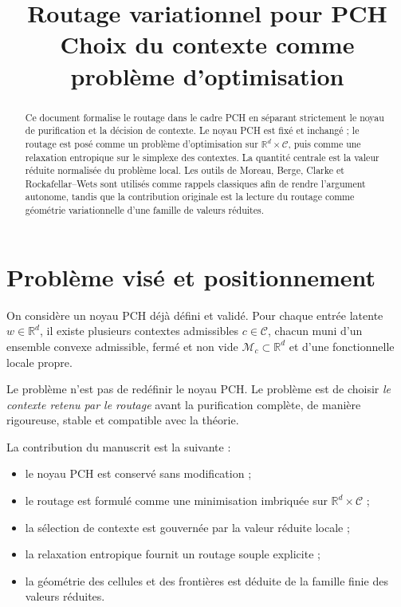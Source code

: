 \documentclass[11pt,a4paper]{article}
\title{Routage variationnel pour PCH\\
\large Choix du contexte comme problème d'optimisation}
\author{}
\date{}
\newcommand{\R}{\mathbb R}
\newcommand{\Mcal}{\mathcal M}
\newcommand{\Ccal}{\mathcal C}
\begin{document}
\maketitle

\begin{abstract}
Ce document formalise le routage dans le cadre PCH en séparant strictement le noyau de purification et la décision de contexte. Le noyau PCH est fixé et inchangé ; le routage est posé comme un problème d'optimisation sur \(\R^d\times\Ccal\), puis comme une relaxation entropique sur le simplexe des contextes. La quantité centrale est la valeur réduite normalisée du problème local. Les outils de Moreau, Berge, Clarke et Rockafellar--Wets sont utilisés comme rappels classiques afin de rendre l'argument autonome, tandis que la contribution originale est la lecture du routage comme géométrie variationnelle d'une famille de valeurs réduites.
\end{abstract}

\tableofcontents

\section{Problème visé et positionnement}

On considère un noyau PCH déjà défini et validé. Pour chaque entrée latente \(w\in\R^d\), il existe plusieurs contextes admissibles \(c\in\Ccal\), chacun muni d'un ensemble convexe admissible, fermé et non vide \(\Mcal_c\subset\R^d\) et d'une fonctionnelle locale propre.

Le problème n'est pas de redéfinir le noyau PCH. Le problème est de choisir \emph{le contexte retenu par le routage} avant la purification complète, de manière rigoureuse, stable et compatible avec la théorie.

La contribution du manuscrit est la suivante :
\begin{itemize}[leftmargin=2em]
    \item le noyau PCH est conservé sans modification ;
    \item le routage est formulé comme une minimisation imbriquée sur \(\R^d\times\Ccal\) ;
    \item la sélection de contexte est gouvernée par la valeur réduite locale ;
    \item la relaxation entropique fournit un routage souple explicite ;
    \item la géométrie des cellules et des frontières est déduite de la famille finie des valeurs réduites.
\end{itemize}
\end{document}
